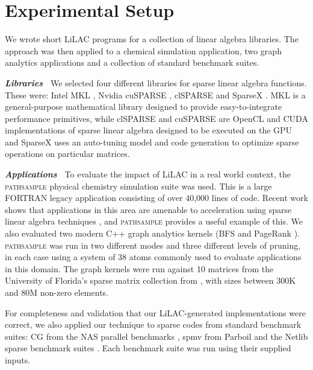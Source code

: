 \section{Experimental Setup}
\label{sec:experimentalsetup}

    We wrote short LiLAC programs for a collection of linear algebra libraries.
    The approach was then applied to a chemical simulation application, two
    graph analytics applications and a collection of standard benchmark suites.

\vspace{0.25em}
\noindent
{\bf\em Libraries\ }
    We selected four different libraries for sparse linear algebra functions.
    These were: Intel MKL \cite{mkl}, Nvidia cuSPARSE \cite{cusparse}, clSPARSE
    \cite{clsparse} and SparseX \cite{sparsex}.
    MKL is a general-purpose mathematical library designed to provide
    easy-to-integrate performance primitives, while clSPARSE and cuSPARSE are
    OpenCL and CUDA implementations of sparse linear algebra designed to be
    executed on the GPU and SparseX uses an auto-tuning model and code
    generation to optimize sparse operations on particular matrices.

\vspace{0.25em}
\noindent
{\bf\em Applications\ }
To evaluate the impact of LiLAC in a real world context, the
\textsc{pathsample} physical chemistry simulation suite was used.
This is a large
FORTRAN legacy application \citep{doi:10.1080/00268970210162691} consisting of
over 40,000 lines of code.
Recent work shows that applications in this area are amenable to acceleration
using sparse linear algebra techniques \cite{SUTHERLANDCASH2017288}, and
\textsc{pathsample} provides a useful example of this.
We also evaluated two modern C++ graph analytics kernels (BFS and PageRank
\cite{demetrescu2009shortest,Beamer2015GAP}).
\textsc{pathsample} was run in two different modes and three different levels of
pruning, in each case using a system of 38 atoms \cite{doi:10.1063/1.478595}
commonly used to evaluate applications in this domain.
The graph kernels were run against 10 matrices from the University of Florida's
sparse matrix collection from \citet{Davis:2011:UFS:2049662.2049663}, with sizes
between 300K and 80M non-zero elements.

\vspace{0.25em}
\noindent
For completeness and validation that our LiLAC-generated implementations were
correct, we also applied our technique to sparse codes from standard benchmark
suites: CG from the NAS parallel benchmarks \cite{Bailey1991NPB}, spmv from
Parboil \cite{Stratton2018} and the Netlib sparse benchmark suites
\cite{Dongarra2001}.
Each benchmark suite was run using their supplied inputs.

